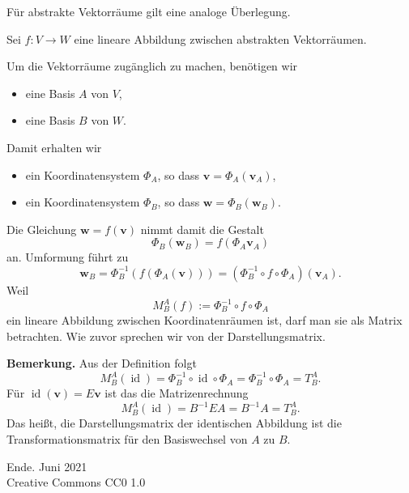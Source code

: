 \documentclass[9pt]{beamer}
\newcommand{\modest}[1]{{\small\color{gray}#1}}
\newcommand{\bv}[1]{\mathbf{#1}}
\newcommand{\id}{\operatorname{id}}
\newcommand{\strong}[1]{\textsf{\textbf{#1}}}
\newcommand{\parspace}{\vspace{0.8em}}
\begin{document}
\begin{frame}
Für abstrakte Vektorräume gilt eine analoge Überlegung.

\parspace
Sei $f\colon V\to W$ eine lineare Abbildung zwischen abstrakten
Vektorräumen.\pause

\parspace
Um die Vektorräume zugänglich zu machen, benötigen wir
\begin{itemize}
\item eine Basis $A$ von $V$,
\item eine Basis $B$ von $W$.
\end{itemize}

\parspace
Damit erhalten wir
\begin{itemize}
\item ein Koordinatensystem $\Phi_A$, so dass $\bv v = \Phi_A(\bv v_A)$,
\item ein Koordinatensystem $\Phi_B$, so dass $\bv w = \Phi_B(\bv w_B)$.
\end{itemize}
\end{frame}

\begin{frame}
Die Gleichung $\bv w = f(\bv v)$ nimmt damit die Gestalt
\[\Phi_B(\bv w_B) = f(\Phi_A\bv v_A)\]
an. Umformung führt zu
\[\bv w_B = \Phi_B^{-1}(f(\Phi_A(\bv v))) = (\Phi_B^{-1}\circ f\circ\Phi_A)(\bv v_A).\]\pause
Weil
\[M_B^A(f) := \Phi_B^{-1}\circ f\circ\Phi_A\]
ein lineare Abbildung zwischen Koordinatenräumen ist, darf man sie
als Matrix betrachten. Wie zuvor sprechen wir von der Darstellungsmatrix.
\end{frame}

\begin{frame}
\strong{Bemerkung.} Aus der Definition folgt
\[M_B^A(\id) = \Phi_B^{-1}\circ\id\circ\Phi_A = \Phi_B^{-1}\circ\Phi_A = T_B^A.\]
Für $\id(\bv v)=E\bv v$ ist das die Matrizenrechnung
\[M_B^A(\id) = B^{-1}EA = B^{-1}A = T_B^A.\]
Das heißt, die Darstellungsmatrix der identischen Abbildung ist die
Transformationsmatrix für den Basiswechsel von $A$ zu $B$.
\end{frame}

\begin{frame}
Ende.
\vfill\hfill\modest{Juni 2021}\\
\hfill\modest{Creative Commons CC0 1.0}
\end{frame}
\end{document}
